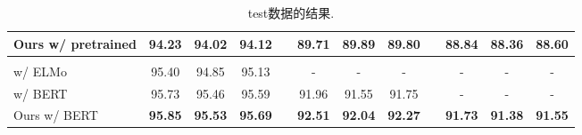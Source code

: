 \begin{table*}[tb]
\begin{tabularx}{\textwidth}{lccccccccccc}
        Ours w/ pretrained                              & \textbf{94.23}           & \textbf{94.02}           & \textbf{94.12}             &  & \textbf{89.71}           & \textbf{89.89}           & \textbf{89.80}           &  & \textbf{88.84} & \textbf{88.36} & \textbf{88.60} \\[1pt]
        \hline
        \\[-8pt]
        \cite{kitaev-klein-2018-constituency} w/ ELMo   & 95.40                    & 94.85                    & 95.13                      &  & -                        & -                        & -                        &  & -              & -              & -              \\
        \cite{kitaev-etal-2019-multilingual} w/ BERT    & 95.73                    & 95.46                    & 95.59                      &  & 91.96                    & 91.55                    & 91.75                    &  & -              & -              & -              \\[3pt]
        Ours w/ BERT                                    & \textbf{95.85}           & \textbf{95.53}           & \textbf{95.69}             &  & \textbf{92.51}           & \textbf{92.04}           & \textbf{92.27}           &  & \textbf{91.73} & \textbf{91.38} & \textbf{91.55} \\
        \bottomrule
    \end{tabularx}
    \caption{test数据的结果.}
    \label{table:test}
\end{table*}

